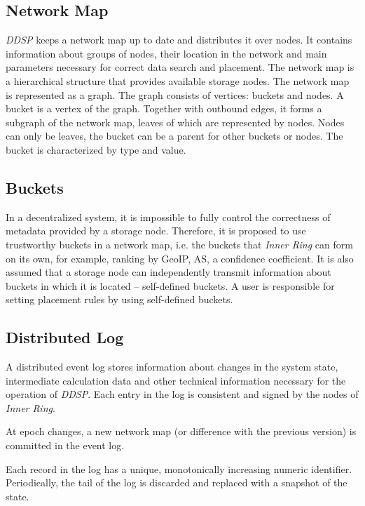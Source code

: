 \documentclass[a4paper, 11pt]{article}
\begin{document}
\subsection{Network Map}

\textit{DDSP} keeps a network map up to date and 
distributes it over nodes. It contains information about groups of nodes, their
location in the network and main parameters necessary for correct data 
search and placement. The network map is a hierarchical structure that provides
available storage nodes. The network map is represented as a graph. The graph 
consists of vertices: buckets and nodes. A bucket is a vertex of the graph. 
Together with outbound edges, it forms a subgraph of the network map, leaves 
of which are represented by nodes. Nodes can only be leaves, the bucket can be 
a parent for other buckets or nodes. The bucket is characterized by type and value.

\subsection{Buckets}
In a decentralized system, it is impossible to fully control the correctness of
metadata provided by a storage node. Therefore, it is proposed to use
trustworthy buckets in a network map, i.e. the buckets that \textit{Inner Ring}
can form on its own, for example, ranking by GeoIP, AS, a confidence coefficient.
It is also assumed that a storage node can independently transmit information
about buckets in which it is located -- self-defined buckets. A user is
responsible for setting placement rules by using self-defined buckets.

\subsection{Distributed Log}

A distributed event log stores information about changes in the system state,
intermediate calculation data and other technical information necessary for
the operation of \textit{DDSP}. Each entry in the log is
consistent and signed by the nodes of \textit{Inner Ring}.

At epoch changes, a new network map (or difference with the previous version) is 
committed in the event log.

Each record in the log has a unique, monotonically increasing numeric
identifier. Periodically, the tail of the log is discarded and replaced with a
snapshot of the state.
\end{document}
